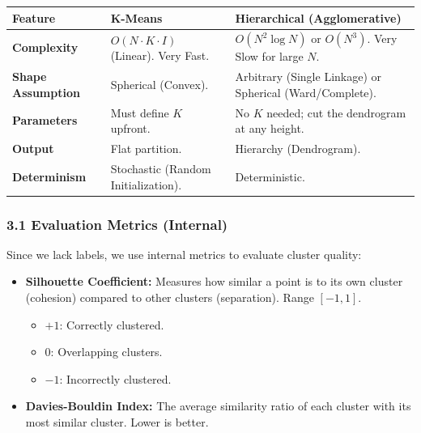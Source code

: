 \documentclass[
  italian,
  11pt,
]{article}
\newcounter{none} %
\begin{document}
{\def\LTcaptype{none} %
\begin{longtable}[]{@{}
  >{\raggedright\arraybackslash}p{}
  >{\raggedright\arraybackslash}p{}
  >{\raggedright\arraybackslash}p{}@{}}
\toprule\noalign{}
\begin{minipage}[b]{\linewidth}\raggedright
\textbf{Feature}
\end{minipage} & \begin{minipage}[b]{\linewidth}\raggedright
\textbf{K-Means}
\end{minipage} & \begin{minipage}[b]{\linewidth}\raggedright
\textbf{Hierarchical (Agglomerative)}
\end{minipage} \\
\midrule\noalign{}
\endhead
\bottomrule\noalign{}
\endlastfoot
\textbf{Complexity} & \(O(N \cdot K \cdot I)\) (Linear). Very Fast. &
\(O(N^2 \log N)\) or \(O(N^3)\). Very Slow for large \(N\). \\
\textbf{Shape Assumption} & Spherical (Convex). & Arbitrary (Single
Linkage) or Spherical (Ward/Complete). \\
\textbf{Parameters} & Must define \(K\) upfront. & No \(K\) needed; cut
the dendrogram at any height. \\
\textbf{Output} & Flat partition. & Hierarchy (Dendrogram). \\
\textbf{Determinism} & Stochastic (Random Initialization). &
Deterministic. \\
\end{longtable}
}

\subsubsection{3.1 Evaluation Metrics
(Internal)}\label{evaluation-metrics-internal}

Since we lack labels, we use internal metrics to evaluate cluster
quality:

\begin{itemize}
\item
  \textbf{Silhouette Coefficient:} Measures how similar a point is to
  its own cluster (cohesion) compared to other clusters (separation).
  Range \([-1, 1]\).

  \begin{itemize}
  \item
    \(+1\): Correctly clustered.
  \item
    \(0\): Overlapping clusters.
  \item
    \(-1\): Incorrectly clustered.
  \end{itemize}
\item
  \textbf{Davies-Bouldin Index:} The average similarity ratio of each
  cluster with its most similar cluster. Lower is better.
\end{itemize}
\end{document}
